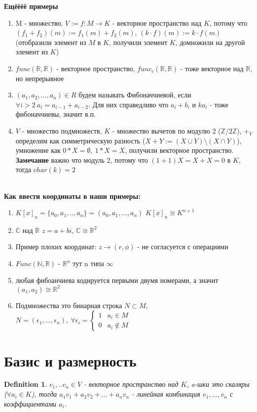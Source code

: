 \documentclass[12pt]{article}
\newtheorem{definition}{Definition}
\begin{document}
\textbf{Ещёёёё примеры} \begin{enumerate}
    \item M - множество, $V := {f : M \rightarrow K}$ - векторное пространство над $K$, потому что $(f_1+f_2)(m):=f_1(m)+f_2(m)$, $(k\cdot f)(m):=k\cdot f(m)$ (отобразили элемент из $M$ в $K$, получили элемент $K$, домножили на другой элемент из $K$)
    \item $func(\mathbb{R}, \mathbb{R})$ - векторное пространство, $func_c(\mathbb{R}, \mathbb{R})$ - тоже векторное над $\mathbb{R}$, но непрерывное
    \item $(a_1, a_2, ..., a_n) \in R$ будем называть Фибоначчиевой, если $\forall i > 2 \ a_i = a_{i - 1} + a_{i - 2}$. Для них справедливо что $a_i + b_i$ и $ka_i$ - тоже фибоначчиевы, значит в.п.
    \item $V$ - множество подмножеств, $K$ - множество вычетов по модулю 2 ($\mathbb{Z}{/2\mathbb{Z}}$), $+_V$ определим как симметрическую разность ($X+Y:=(X\cup Y)\setminus (X\cap Y)$), умножение как $0*X = \emptyset,\ 1*X = X$, получили векторное пространство. \textbf{Замечание} важно что модуль 2, потому что $(1 + 1) X = X + X = 0$ в $K$, тогда $char(k) = 2$
\end{enumerate}
\\

\textbf{Как ввести координаты в наши примеры:}
\begin{enumerate}
    \item $K[x]_n = \{a_0, a_1, .. , a_n\} = (a_0, a_1, ..., a_n)$ $K[x]_n \cong K^{n + 1}$
    \item $\mathbb{C}$ над $\mathbb{R}$ $z = a + bi$, $\mathbb{C} \cong \mathbb{R}^2$
    \item Пример плохих координат: $z \rightarrow (r, \phi)$ - не согласуется с операциями
    \item $Func(\mathbb{N}, \mathbb{R})$ - $\mathbb{R}^{n}$ тут n типа $\infty$
    \item любая фибоанчиева кодируется первыми двумя номерами, а значит $(a_1, a_2) \cong \mathbb{R}^2$ 
    \item Подмножества это бинарная строка $N \subset M$, $N = (\epsilon_1, ..., \epsilon_n), \ \forall \epsilon_i = 
 \begin{cases}
   1 & a_i \in M\\
   0 & a_i \notin M
 \end{cases}$
\end{enumerate} 



\section{Базис и размерность} 
\begin{definition}
    $v_1, .. v_n \in V$ - векторное пространство над $K$, a-шки это скаляры ($\forall a_i \in K$), тогда $a_1v_1 + a_2v_2 + ... + a_nv_n$ - линейная комбинация $v_1, ..., v_n$ с коэффициентами $a_i$. 
\end{definition}
\end{document}
